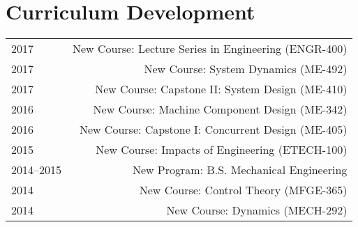 \section*{Curriculum Development}
\begin{tabular}{L!{\VRule}R}
2017&New Course: Lecture Series in Engineering (ENGR-400)\\
2017&New Course: System Dynamics (ME-492)\\
2017&New Course: Capstone II: System Design (ME-410)\\
2016&New Course: Machine Component Design (ME-342)\\
2016&New Course: Capstone I: Concurrent Design (ME-405)\\
2015&New Course: Impacts of Engineering (ETECH-100)\\
2014--2015&New Program: B.S. Mechanical Engineering\\
2014&New Course: Control Theory (MFGE-365)\\
2014&New Course: Dynamics (MECH-292)\\
\end{tabular}